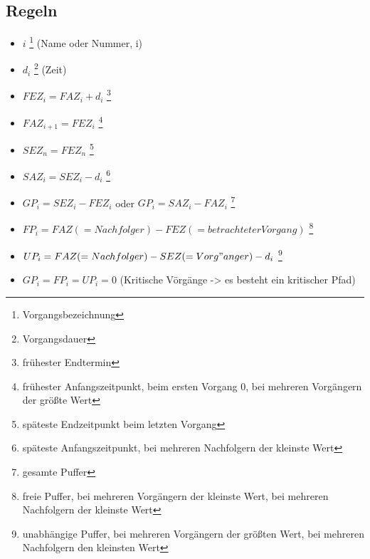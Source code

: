 \documentclass[a4paper,12pt]{scrartcl}
\begin{document}
\subsection{Regeln}
\begin{itemize}
\item $i$ \footnote{Vorgangsbezeichnung} (Name oder Nummer, i) 
\item $d_i$ \footnote{Vorgangsdauer} (Zeit)
\item $FEZ_i = FAZ_i + d_i$ \footnote{frühester Endtermin}
\item $FAZ_{i+1} = FEZ_i$ \footnote{frühester Anfangszeitpunkt, beim ersten Vorgang 0, bei mehreren Vorgängern der größte Wert}
\item $SEZ_n = FEZ_n$ \footnote{späteste Endzeitpunkt beim letzten Vorgang}
\item $SAZ_i = SEZ_i - d_i$ \footnote{späteste Anfangszeitpunkt, bei mehreren Nachfolgern der kleinste Wert}
\item $GP_i = SEZ_i - FEZ_i$ oder $GP_i = SAZ_i - FAZ_i$ \footnote{gesamte Puffer}
\item $FP_i = FAZ (= Nachfolger) - FEZ (= betrachteter Vorgang)$ \footnote{freie Puffer, bei mehreren Vorgängern der kleinste Wert, bei mehreren Nachfolgern der kleinste Wert}
\item $UP_i = FAZ (= Nachfolger) - SEZ (= Vorg"anger) - d_i$ \footnote{unabhängige Puffer, bei mehreren Vorgängern der größten Wert, bei mehreren Nachfolgern den kleinsten Wert}
\item $GP_i = FP_i = UP_i = 0$ (Kritische Vörgänge -> es besteht ein kritischer Pfad)

\end{itemize}
\end{document}
